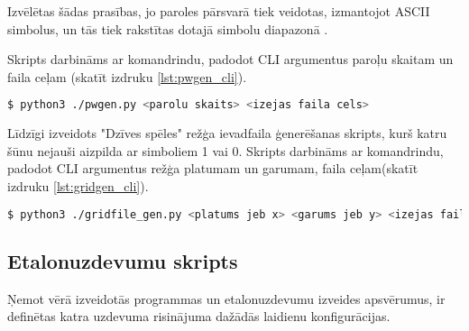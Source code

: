 Izvēlētas šādas prasības, jo paroles pārsvarā tiek veidotas, izmantojot ASCII
simbolus, un tās  tiek rakstītas dotajā simbolu diapazonā
\cite{pw_user_practice}.

Skripts darbināms ar komandrindu, padodot CLI argumentus paroļu skaitam
un faila ceļam (skatīt izdruku \ref{lst:pwgen_cli}).
\begin{lstlisting}[caption={Paroļu faila ģenerēšanas skripta darbināšana},
    captionpos=b,
    label=lst:pwgen_cli, language=bash]
$ python3 ./pwgen.py <parolu skaits> <izejas faila cels>
\end{lstlisting}

Līdzīgi izveidots "Dzīves spēles" režģa ievadfaila ģenerēšanas skripts, kurš
katru šūnu nejauši aizpilda ar simboliem 1 vai 0. Skripts darbināms ar 
komandrindu, padodot CLI argumentus režģa platumam un garumam, faila
ceļam(skatīt izdruku \ref{lst:gridgen_cli}).

\begin{lstlisting}[caption={Režģa faila ģenerēšanas skripta darbināšana},
    captionpos=b,
    label=lst:gridgen_cli, language=bash]
$ python3 ./gridfile_gen.py <platums jeb x> <garums jeb y> <izejas faila cels>
\end{lstlisting}

\subsection{Etalonuzdevumu skripts}
Ņemot vērā izveidotās programmas un etalonuzdevumu izveides apsvērumus, ir
definētas katra uzdevuma risinājuma dažādās laidienu konfigurācijas.

